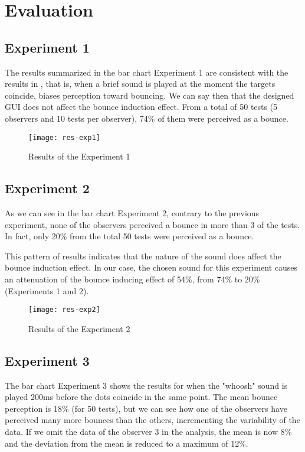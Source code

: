 \section{Evaluation}

\subsection{Experiment 1}
The results summarized in the bar chart Experiment 1 are consistent with the results in \cite{sekuler1997}, that is, when a brief sound is played at the moment the targets coincide, biases perception toward bouncing. We can say then that the designed GUI does not affect the bounce induction effect. From a total of 50 tests (5 observers and 10 tests per observer), 74\% of them were perceived as a bounce. 

\begin{figure}[!ht]
		\centering
		\vspace{0.5cm}
		\texttt{[image: res-exp1]}
		\caption{Results of the Experiment 1}
\end{figure} 

\subsection{Experiment 2}
 As we can see in the bar chart Experiment 2, contrary to the previous experiment, none of the observers perceived a bounce in more than 3 of the tests. In fact, only 20\% from the total 50 tests were perceived as a bounce.

This pattern of results indicates that the nature of the sound does affect the bounce induction effect. In our case, the chosen sound for this experiment causes an attenuation of the bounce inducing effect of 54\%, from 74\% to 20\% (Experiments 1 and 2). 

\begin{figure}[!ht]
		\centering
		\vspace{0.5cm}
		\texttt{[image: res-exp2]}
		\caption{Results of the Experiment 2}
\end{figure} 

\subsection{Experiment 3}
 The bar chart Experiment 3 shows the results for when the "whoosh" sound is played 200ms before the dots coincide in the same point. The mean bounce perception is 18\% (for 50 tests), but we can see how one of the observers have perceived many more bounces than the others, incrementing the variability of the data. If we omit the data of the observer 3 in the analysis, the mean is now 8\% and the deviation from the mean is reduced to a maximum of 12\%.

